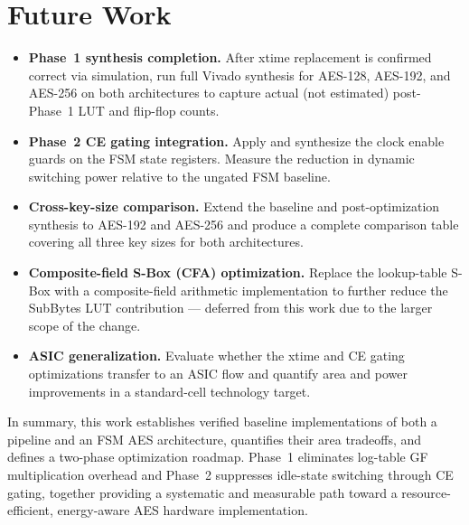 \section{Future Work}

\begin{itemize}
  \item \textbf{Phase~1 synthesis completion.}
        After xtime replacement is confirmed correct via simulation, run full Vivado
        synthesis for AES-128, AES-192, and AES-256 on both architectures to capture
        actual (not estimated) post-Phase~1 LUT and flip-flop counts.

  \item \textbf{Phase~2 CE gating integration.}
        Apply and synthesize the clock enable guards on the FSM state registers.
        Measure the reduction in dynamic switching power relative to the ungated FSM baseline.

  \item \textbf{Cross-key-size comparison.}
        Extend the baseline and post-optimization synthesis to AES-192 and AES-256 and
        produce a complete comparison table covering all three key sizes for both architectures.

  \item \textbf{Composite-field S-Box (CFA) optimization.}
        Replace the lookup-table S-Box with a composite-field arithmetic implementation to
        further reduce the SubBytes LUT contribution --- deferred from this work due to the
        larger scope of the change.

  \item \textbf{ASIC generalization.}
        Evaluate whether the xtime and CE gating optimizations transfer to an ASIC flow
        and quantify area and power improvements in a standard-cell technology target.
\end{itemize}

\noindent
In summary, this work establishes verified baseline implementations of both a pipeline and
an FSM AES architecture, quantifies their area tradeoffs, and defines a two-phase
optimization roadmap. Phase~1 eliminates log-table GF multiplication overhead and Phase~2
suppresses idle-state switching through CE gating, together providing a systematic and
measurable path toward a resource-efficient, energy-aware AES hardware implementation.
